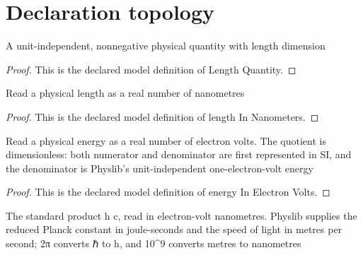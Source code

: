 \section{Declaration topology}
\begin{definition}
  \label{def:physics:phyx-mini-0519:phyxminiproblems-problemphyxmini0519-lengthquantity}
  A unit-independent, nonnegative physical quantity with length dimension
\end{definition}
\begin{proof}
  This is the declared model definition of Length Quantity.
\end{proof}
\begin{definition}
  \label{def:physics:phyx-mini-0519:phyxminiproblems-problemphyxmini0519-lengthinnanometers}
  Read a physical length as a real number of nanometres
\end{definition}
\begin{proof}
  This is the declared model definition of length In Nanometers.
\end{proof}
\begin{definition}
  \label{def:physics:phyx-mini-0519:phyxminiproblems-problemphyxmini0519-energyinelectronvolts}
  Read a physical energy as a real number of electron volts. The quotient is dimensionless: both numerator and denominator are first represented in SI, and the denominator is Physlib's unit-independent one-electron-volt energy
\end{definition}
\begin{proof}
  This is the declared model definition of energy In Electron Volts.
\end{proof}
\begin{definition}
  \label{def:physics:phyx-mini-0519:phyxminiproblems-problemphyxmini0519-plancktimeslightinelectronvoltnanometers}
  The standard product h c, read in electron-volt nanometres. Physlib supplies the reduced Planck constant in joule-seconds and the speed of light in metres per second; 2π converts ℏ to h, and 10\textasciicircum{}9 converts metres to nanometres
\end{definition}
